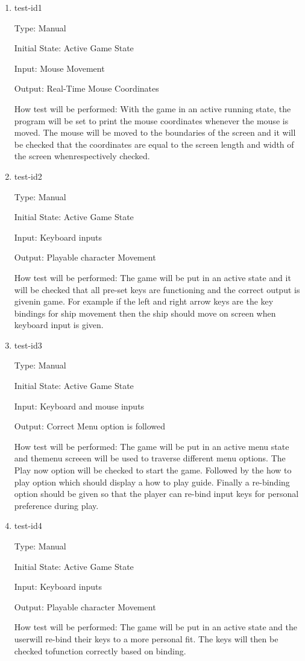 \documentclass[12pt, titlepage]{article}
\begin{document}
\begin{enumerate}

\item{test-id1\\}

Type: Manual 
					
Initial State: Active Game State 
					
Input: Mouse Movement 
					
Output: Real-Time Mouse Coordinates 
					
How test will be performed: With the game in an active running state, the
program will be set to print the mouse coordinates whenever the mouse is moved.
The mouse will be moved to the boundaries of the screen and it will be checked
that the coordinates are equal to the screen length and width of the screen
whenrespectively checked.
					
\item{test-id2\\}

Type: Manual 
					
Initial State: Active Game State 
					
Input: Keyboard inputs
					
Output: Playable character Movement
					
How test will be performed: The game will be put in an active state and it will
be checked that all pre-set keys are functioning and the correct output is
givenin game. For example if the left and right arrow keys are the key bindings
for
ship movement then the ship should move on screen when keyboard input is given.


\item{test-id3\\}

Type: Manual
					
Initial State: Active Game State
					
Input: Keyboard and mouse inputs 
					
Output: Correct Menu option is followed 
					
How test will be performed: The game will be put in an active menu state and
themenu screeen will be used to traverse different menu options. The Play now
option will be checked to start the game. Followed by the how to play option
which should display a how to play guide. Finally a re-binding option should be
given so that the player can re-bind input keys for personal preference during
play.


\item{test-id4\\}

Type: Manual

Initial State: Active Game State 

Input: Keyboard inputs

Output: Playable character Movement

How test will be performed: The game will be put in an active state and the
userwill re-bind their keys to a more personal fit. The keys will then be
checked tofunction correctly based on binding.

\end{enumerate}
\end{document}
